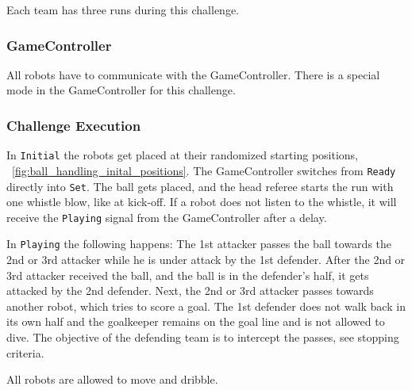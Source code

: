    Each team has three runs during this challenge.

    \subsubsection{GameController}
        All robots have to communicate with the GameController. There is a special mode in the GameController for this challenge. 

    \subsubsection{Challenge Execution}

        In \texttt{Initial} the robots get placed at their randomized starting positions, \cf~\cref{fig:ball_handling_inital_positions}. The GameController switches from \texttt{Ready} directly into \texttt{Set}. The ball gets placed, and the head referee starts the run with one whistle blow, like at kick-off. If a robot does not listen to the whistle, it will receive the \texttt{Playing} signal from the GameController after a delay.

        In \texttt{Playing} the following happens: The 1st attacker passes the ball towards the 2nd or 3rd attacker while he is under attack by the 1st defender. After the 2nd or 3rd attacker received the ball, and the ball is in the defender's half, it gets attacked by the 2nd defender. Next, the 2nd or 3rd attacker passes towards another robot, which tries to score a goal.
        The 1st defender does not walk back in its own half and the goalkeeper remains on the goal line and is not allowed to dive. The objective of the defending team is to intercept the passes, see stopping criteria.

        All robots are allowed to move and dribble.

